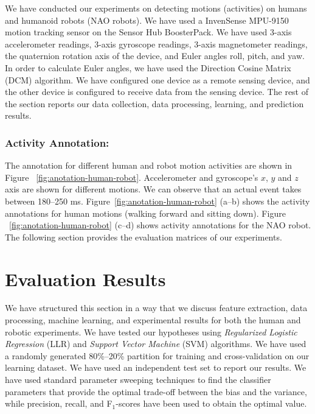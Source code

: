 \documentclass[letterpaper]{article}
\begin{document}
\begin{sloppy}
We have conducted our experiments on detecting motions (activities) on 
humans and humanoid robots (NAO robots). We have used a InvenSense MPU-9150 
motion tracking sensor on the Sensor Hub BoosterPack. 
% 
% 
We have used 3-axis accelerometer readings, 3-axis gyroscope readings, 3-axis magnetometer readings, 
the quaternion rotation axis of the device, and Euler angles roll, pitch, and yaw.  In order to 
calculate Euler angles, we have used the Direction Cosine Matrix (DCM) algorithm. We have configured 
one device as a remote sensing device, and the other device is configured to receive data from the 
sensing device. The rest of the  section reports our data collection, data processing, learning, 
and prediction results.


\subsubsection{Activity Annotation:} The annotation for different human and robot motion activities 
are shown in 
Figure {~\ref{fig:anotation-human-robot}}. 
Accelerometer and gyroscope's $x$, $y$ and $z$ axis are shown for different motions. We can observe 
that an 
actual event takes between 180--250 ms. Figure{~\ref{fig:anotation-human-robot}} (a--b) shows the 
activity annotations for human motions (walking forward and sitting down). 
Figure {~\ref{fig:anotation-human-robot}}
(c--d) shows activity annotations for the NAO robot. The following section provides the evaluation 
matrices of our experiments. 


\section{Evaluation Results}
We have structured this section in a way that we discuss feature extraction, data processing, 
machine learning, and experimental results for both the human and robotic experiments. We have 
tested our hypotheses using  {\em Regularized Logistic Regression} (LLR) and {\em Support 
Vector Machine} (SVM) algorithms. We have used a randomly generated 80\%--20\% partition for 
training and cross-validation on our learning dataset. We have used an independent test set to 
report our results. We have used standard parameter sweeping techniques to find the classifier 
parameters that provide the optimal trade-off between the bias and the variance, while precision, 
recall, and F$_1$-scores have been used to obtain the optimal value. 


\end{sloppy}
\end{document}
